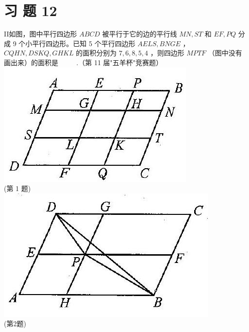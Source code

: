 \documentclass[10pt]{article}
\begin{document}
\section*{习 题 12}
II如图，图中平行四边形 $A B C D$ 被平行于它的边的平行线 $M N, S T$ 和 $E F, P Q$ 分成 9 个小平行四边形。已知 5 个平行四边形 $A E L S, B N G E$ ， $C Q H N, D S K Q, G H K L$ 的面积分别为 $7,6,8,5,4$ ，则四边形 $M P T F$ （图中没有画出来）的面积是 $\qquad$ .（第 11 届"五羊杯"竞赛题）\\
\includegraphics[max width=\textwidth, center]{2024_10_30_2c8f45efd4a519b08e1ag-117(4)}\\
(第 1 题)\\
\includegraphics[max width=\textwidth, center]{2024_10_30_2c8f45efd4a519b08e1ag-117(3)}\\
(第2题)\\
\end{document}
